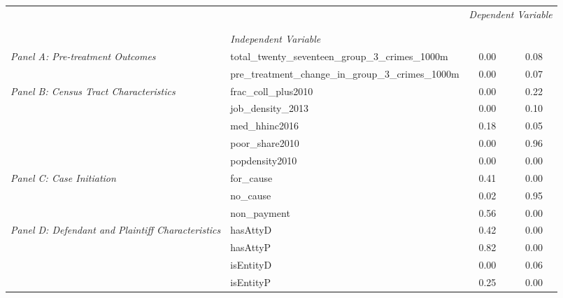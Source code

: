 \begin{tabular}{llcc}
\toprule
 &  & \multicolumn{2}{c}{\textit{Dependent Variable}} \\
\cline{3-4}
\\
 &  &  &  \\
 & \emph{Independent Variable} &  &  \\
\midrule
\multirow[c]{2}{3cm}{\textit{Panel A: Pre-treatment Outcomes}} & total_twenty_seventeen_group_3_crimes_1000m & 0.00 & 0.08 \\
 & pre_treatment_change_in_group_3_crimes_1000m & 0.00 & 0.07 \\
\cline{1-4}
\multirow[c]{5}{3cm}{\textit{Panel B: Census Tract Characteristics}} & frac_coll_plus2010 & 0.00 & 0.22 \\
 & job_density_2013 & 0.00 & 0.10 \\
 & med_hhinc2016 & 0.18 & 0.05 \\
 & poor_share2010 & 0.00 & 0.96 \\
 & popdensity2010 & 0.00 & 0.00 \\
\cline{1-4}
\multirow[c]{3}{3cm}{\textit{Panel C: Case Initiation}} & for_cause & 0.41 & 0.00 \\
 & no_cause & 0.02 & 0.95 \\
 & non_payment & 0.56 & 0.00 \\
\cline{1-4}
\multirow[c]{4}{3cm}{\textit{Panel D: Defendant and Plaintiff Characteristics}} & hasAttyD & 0.42 & 0.00 \\
 & hasAttyP & 0.82 & 0.00 \\
 & isEntityD & 0.00 & 0.06 \\
 & isEntityP & 0.25 & 0.00 \\
\cline{1-4}
\bottomrule
\end{tabular}

